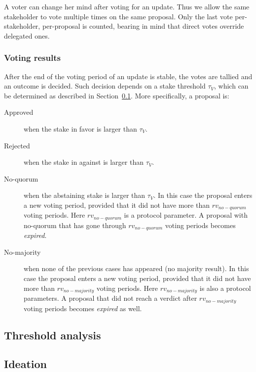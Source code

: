 \documentclass[11pt,a4paper]{article}
\begin{document}
A voter can change her mind after voting for an update. Thus we allow the same
stakeholder to vote multiple times on the same proposal. Only the last vote
per-stakeholder, per-proposal is counted, bearing in mind that direct votes
override delegated ones.

\subsubsection{Voting results}
\label{sec:voting-results}

After the end of the voting period of an update is stable, the votes are tallied
and an outcome is decided.
%
Such decision depends on a stake threshold $\tau_V$, which can be determined as
described in Section~\ref{sec:threshold-analysis}. More specifically, a proposal
is:
\begin{description}
\item[Approved] when the stake in favor is larger than $\tau_V$.
\item[Rejected] when the stake in against is larger than $\tau_V$.
\item[No-quorum] when the abstaining stake is larger than $\tau_V$. In this
  case the proposal enters a new voting period, provided that it did not
  have more than $rv_{no-quorum}$ voting periods. Here $rv_{no-quorum}$ is a
  protocol parameter. A proposal with no-quorum that has gone through
  $rv_{no-quorum}$ voting periods becomes \emph{expired}.
\item[No-majority] when none of the previous cases has appeared (no majority
  result). In this case the proposal enters a new voting period, provided that
  it did not have more than $rv_{no-majority}$ voting periods. Here
  $rv_{no-majority}$ is also a protocol parameters. A proposal that did not
  reach a verdict after $rv_{no-majority}$ voting periods becomes \emph{expired}
  as well.
\end{description}

\subsection{Threshold analysis}
\label{sec:threshold-analysis}

\subsection{Ideation}
\label{sec:ideation}
\end{document}
